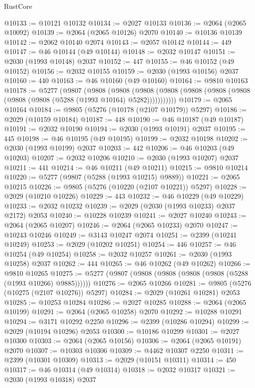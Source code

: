 \begin{lexlean}{RustCore}
\begin{coremodule}
@10133 := @10121 @10132
@10134 := @2027 @10133
@10136 := @2064 (@2065 @10092)
@10139 := @2064 (@2065 @10126) @2070
@10140 := @10136 @10139
@10142 := @2062 @10140 @2074
@10143 := @2057 @10142
@10144 := 449
@10147 := @46 @10144 (@49 @10144)
@10148 := @2032 @10147
@10151 := @2030 (@1993 @10148) @2037
@10152 := 447
@10155 := @46 @10152 (@49 @10152)
@10156 := @2032 @10155
@10159 := @2030 (@1993 @10156) @2037
@10160 := 440
@10163 := @46 @10160 (@49 @10160)
@10164 := @9810 @10163
@10178 := @5277
    (@9807
      (@9808
        (@9808
          (@9808 (@9808 (@9808 (@9808 (@9808 (@9808 (@9808 (@5288 (@1993 @10164) @5282)))))))))))
@10179 := @2065 @10164
@10184 := @9805 (@5276 (@10178 (@2107 @10179)) @5297)
@10186 := @2029 (@10159 @10184)
@10187 := 448
@10190 := @46 @10187 (@49 @10187)
@10191 := @2032 @10190
@10194 := @2030 (@1993 @10191) @2037
@10195 := 445
@10198 := @46 @10195 (@49 @10195)
@10199 := @2032 @10198
@10202 := @2030 (@1993 @10199) @2037
@10203 := 442
@10206 := @46 @10203 (@49 @10203)
@10207 := @2032 @10206
@10210 := @2030 (@1993 @10207) @2037
@10211 := 441
@10214 := @46 @10211 (@49 @10211)
@10215 := @9810 @10214
@10220 := @5277 (@9807 (@5288 (@1993 @10215) @9889))
@10221 := @2065 @10215
@10226 := @9805 (@5276 (@10220 (@2107 @10221)) @5297)
@10228 := @2029 (@10210 @10226)
@10229 := 443
@10232 := @46 @10229 (@49 @10229)
@10233 := @2032 @10232
@10239 := @2029 (@2030 (@1993 @10233) @2037 @2172) @2053
@10240 := @10228 @10239
@10241 := @2027 @10240
@10243 := @2064 (@2065 @10207)
@10246 := @2064 (@2065 @10233) @2070
@10247 := @10243 @10246
@10249 := @3143 @10247 @2074
@10251 := @2399 (@10241 @10249)
@10253 := @2029 (@10202 @10251)
@10254 := 446
@10257 := @46 @10254 (@49 @10254)
@10258 := @2032 @10257
@10261 := @2030 (@1993 @10258) @2037
@10262 := 444
@10265 := @46 @10262 (@49 @10262)
@10266 := @9810 @10265
@10275 := @5277 (@9807 (@9808 (@9808 (@9808 (@9808 (@5288 (@1993 @10266) @9885))))))
@10276 := @2065 @10266
@10281 := @9805 (@5276 (@10275 (@2107 @10276)) @5297)
@10284 := @2029 (@10261 @10281) @2053
@10285 := @10253 @10284
@10286 := @2027 @10285
@10288 := @2064 (@2065 @10199)
@10291 := @2064 (@2065 @10258) @2070
@10292 := @10288 @10291
@10294 := @3171 @10292 @2250
@10296 := @2399 (@10286 @10294)
@10299 := @2029 (@10194 @10296) @2053
@10300 := @10186 @10299
@10301 := @2027 @10300
@10303 := @2064 (@2065 @10156)
@10306 := @2064 (@2065 @10191) @2070
@10307 := @10303 @10306
@10309 := @4462 @10307 @2250
@10311 := @2399 (@10301 @10309)
@10313 := @2029 (@10151 @10311)
@10314 := 450
@10317 := @46 @10314 (@49 @10314)
@10318 := @2032 @10317
@10321 := @2030 (@1993 @10318) @2037

\end{coremodule}
\end{lexlean}
